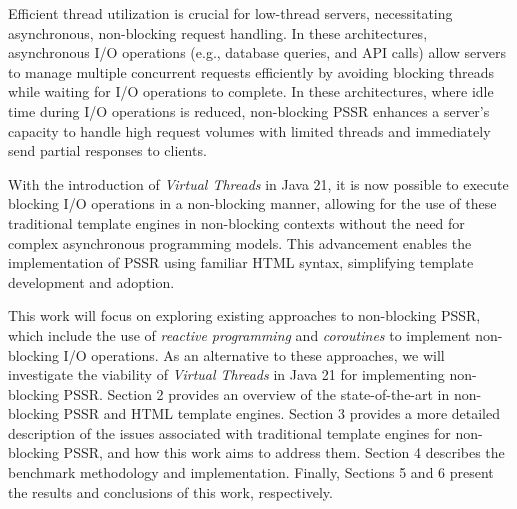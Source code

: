 Efficient thread utilization is crucial for low-thread servers, necessitating
asynchronous, non-blocking request handling. In these architectures,
asynchronous I/O operations (e.g., database queries, and API calls) allow
servers to manage multiple concurrent requests efficiently by avoiding blocking
threads while waiting for I/O operations to complete. In these architectures,
where idle time during I/O operations is reduced, non-blocking PSSR enhances a
server's capacity to handle high request volumes with limited threads and
immediately send partial responses to clients.

With the introduction of \textit{Virtual Threads} in Java 21, it is now possible to execute blocking
I/O operations in a non-blocking manner, allowing for the use of these 
traditional template engines in non-blocking contexts without the need for
complex asynchronous programming models. This advancement enables the 
implementation of PSSR using familiar HTML syntax, simplifying template
development and adoption. 

This work will focus on exploring existing approaches to non-blocking PSSR,
which include the use of \textit{reactive programming} and \textit{coroutines}
to implement non-blocking I/O operations. As an alternative to these
approaches, we will investigate the viability of \textit{Virtual Threads} in Java 21 
for implementing non-blocking PSSR\@. Section 2 provides an overview
of the state-of-the-art in non-blocking PSSR and HTML template engines. Section
3 provides a more detailed description of the issues associated with
traditional template engines for non-blocking PSSR, and how this work aims to
address them. Section 4 describes the benchmark methodology and implementation.
Finally, Sections 5 and 6 present the results and conclusions of this work,
respectively.